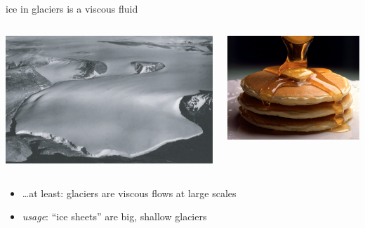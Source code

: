 \documentclass{beamer}
\begin{document}
\begin{frame}{ice in glaciers is a viscous fluid}
\begin{columns}
\begin{column}{0.65\textwidth}
\includegraphics[width=1.0\textwidth]{polaris}
\end{column}
\begin{column}{0.35\textwidth}
\includegraphics[width=1.0\textwidth]{pancakes}
\end{column}
\end{columns}

\bigskip\bigskip
\begin{itemize}
\item \dots at least: glaciers are viscous flows at large scales
\item \emph{usage}: ``ice sheets'' are big, shallow glaciers
\end{itemize}
\end{frame}
\end{document}
